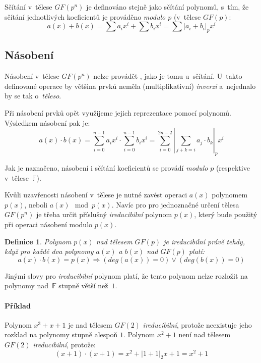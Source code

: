 \documentclass[thesis=M,czech,hidelinks]{FITthesis}[2012/06/26]
\newcommand{\0}{{\textcolor[gray]{0.75}{0}}}
\newtheorem{definice}{Definice}
\begin{document}
Sčítání v~tělese $GF(p^n)$ je definováno stejně jako sčítání polynomů, s~tím, že
sčítání jednotlivých koeficientů je prováděno \emph{modulo $p$} (v~tělese
$GF(p)$:
$$
    a(x) + b(x) = \sum a_i x^i + \sum b_i x^i =
    \sum \left|a_i + b_i\right|_p x^i
$$


\subsection{Násobení}

Násobení v~tělese $GF(p^n)$ nelze provádět , jako je tomu
u~sčítání. U~takto definované operace by většina prvků neměla (multiplikativní)
\emph{inverzi} a~nejednalo by se tak o~\emph{těleso}.

Při násobení prvků opět využijeme jejich reprezentace pomocí polynomů.
Výsledkem násobení pak je:
$$
    a(x) \cdot b(x) = \sum_{i=0}^{n-1} a_i x^i \cdot \sum_{i=0}^{n-1} b_i x^i =
    \sum_{i=0}^{2n-2} \left|\sum_{j+k=i} a_j \cdot b_k\right|_p x^i
$$

Jak je naznačeno, násobení i sčítání koeficientů se provádí \emph{modulo} $p$
(respektive v~tělese~$\mathbb{F}$).

Kvůli uzavřenosti násobení v~tělese je nutné zavést operaci  $a(x)$ polynomem $p(x)$, neboli $a(x) \mod p(x)$. Navíc pro pro
jednoznačné určení tělesa $GF(p^n)$ je třeba určit příslušný \emph{ireducibilní}
polynom $p(x)$, který bude použitý při operaci násobení modulo $p(x)$.

\begin{definice}
    Polynom $p(x)$ nad tělesem $GF(p)$ je \emph{ireducibilní} právě tehdy, když
    pro každé dva polynomy $a(x)$ a $b(x)$ nad $GF(p)$ platí:
    $$
        a(x) \cdot b(x) = p(x) \Rightarrow \left( deg(a(x)) = 0 \right) \lor
        \left( deg(b(x)) = 0 \right)
    $$
\end{definice}

Jinými slovy pro \emph{ireducibilní} polynom platí, že tento polynom nelze
rozložit na polynomy nad~$\mathbb{F}$ stupně větší než~$1$.


\paragraph{Příklad} Polynom $x^3+x+1$ je nad tělesem $GF(2)$
\emph{ireducibilní}, protože neexistuje jeho rozklad na polynomy stupně alespoň
$1$. Polynom $x^2+1$ není nad tělesem $GF(2)$ \emph{ireducibilní}, protože:
$$ (x+1)\cdot(x+1) = x^2 + \left|1+1\right|_2x + 1 = x^2+1 $$
\end{document}
